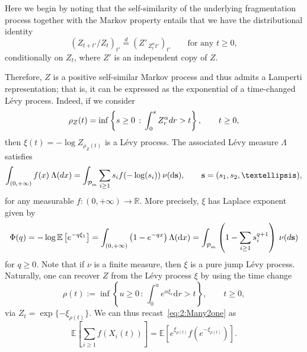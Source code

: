 \documentclass[a4,12pt]{amsart}
\numberwithin{equation}{section}
\newcommand{\MassP}{\mathcal{P}_{\rm m}}
\begin{document}
    Here we begin by noting that the self-similarity of the underlying fragmentation process together with the 
    Markov property entails that we have the distributional identity 
	\begin{equation*}
		\left(Z_{t+t'}/Z_t\right)_{t'} \stackrel{d}{=} \left(Z'_{\, Z_t^{\alpha} t'}\right)_{t'} \qquad   \text{for any $t \geq 0$},
	\end{equation*}
	conditionally on $Z_t$, where $Z'$ is an independent copy of $Z$.  

	Therefore, $Z$ is a positive self-similar Markov process and thus admits a Lamperti representation; that is, it can be expressed as the exponential of a time-changed L\'evy process. Indeed, if we consider
	\begin{equation*}
		\rho_Z(t) = 
		\inf\left\{ s\geq 0 \, : \, \int_0^s Z_r^\alpha {\rm d} r >t \right\}, \qquad t\geq 0,
	\end{equation*}
	then $\xi(t) = -\log Z_{\rho_Z(t)}$ is a
	L\'evy process. The associated L\'evy measure $\Lambda$ satisfies
	\begin{equation}\label{eq:measure}
		\int_{(0, +\infty)} f(x) \:  \Lambda ({\rm d} x)  
		= \int_{\MassP}\sum_{i\geq 1} s_i f(-\log(s_i)) \: \nu ( \mathrm{ d}  \mathbf{s}), 
		\qquad \mathbf{s} = (s_1,s_2, \ldots),
	\end{equation}
   for any measurable $f \colon (0,+\infty) \to \mathbb{R}$.
	More precisely, $\xi$ has  Laplace exponent given by
	\begin{equation}\label{eq:Phidef}
		\Phi(q) = - \log \mathbb{E}\left[e^{-q \xi_1}\right] 
		= \int_{(0, +\infty)} \left(1-e^{-qx}\right) \Lambda(\mathrm{d} x)
		= \int_{\MassP} \left(1 - \sum_{i \geq 1} s_i^{q+1} \right) \: \nu({\rm d} \mathbf{s})
	\end{equation}
	for $q\geq 0$.
	Note that if $\nu$ is a finite measure, then $\xi$ is a pure jump L\'evy process. 
	Naturally, one can recover $Z$ from the L\'evy process $\xi$ by using the time change
	\begin{equation} \label{eq:rhodef}
		\rho(t) := \inf \left\{ u \geq 0 \,:\, \int_0^u e^{\alpha \xi_r} \mathrm{d}r > t \right\}, 
		\qquad t \geq 0,
	\end{equation}
	via $Z_t = \exp \{ -\xi_{\rho(t)} \}$. We can thus recast~\eqref{eq:2:Many2one} as
	\begin{equation} \label{eq:m21f}
	\mathbb{E} \left[ \sum_{i \geq 1} f(X_i(t)) \right] = 
		\mathbb{E}\left[ e^{\xi_{\rho(t)}}f\left(e^{-\xi_{\rho(t)}}\right)\right].
	\end{equation}
    
\end{document}
